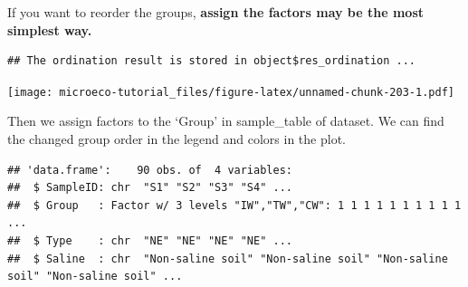 \documentclass[
]{book}
\newenvironment{Shaded}{\begin{snugshade}}{\end{snugshade}}
\newcommand{\AttributeTok}[1]{\textcolor[rgb]{0.77,0.63,0.00}{#1}}
\newcommand{\ConstantTok}[1]{\textcolor[rgb]{0.00,0.00,0.00}{#1}}
\newcommand{\FunctionTok}[1]{\textcolor[rgb]{0.00,0.00,0.00}{#1}}
\newcommand{\NormalTok}[1]{#1}
\newcommand{\OtherTok}[1]{\textcolor[rgb]{0.56,0.35,0.01}{#1}}
\newcommand{\SpecialCharTok}[1]{\textcolor[rgb]{0.00,0.00,0.00}{#1}}
\newcommand{\StringTok}[1]{\textcolor[rgb]{0.31,0.60,0.02}{#1}}
\begin{document}
If you want to reorder the groups, \textbf{assign the factors may be the most simplest way.}

\begin{Shaded}
\end{Shaded}

\begin{verbatim}
## The ordination result is stored in object$res_ordination ...
\end{verbatim}

\begin{Shaded}
\end{Shaded}

\texttt{[image: microeco-tutorial\_files/figure-latex/unnamed-chunk-203-1.pdf]}

Then we assign factors to the `Group' in sample\_table of dataset.
We can find the changed group order in the legend and colors in the plot.

\begin{Shaded}
\end{Shaded}

\begin{verbatim}
## 'data.frame':    90 obs. of  4 variables:
##  $ SampleID: chr  "S1" "S2" "S3" "S4" ...
##  $ Group   : Factor w/ 3 levels "IW","TW","CW": 1 1 1 1 1 1 1 1 1 1 ...
##  $ Type    : chr  "NE" "NE" "NE" "NE" ...
##  $ Saline  : chr  "Non-saline soil" "Non-saline soil" "Non-saline soil" "Non-saline soil" ...
\end{verbatim}
\end{document}
